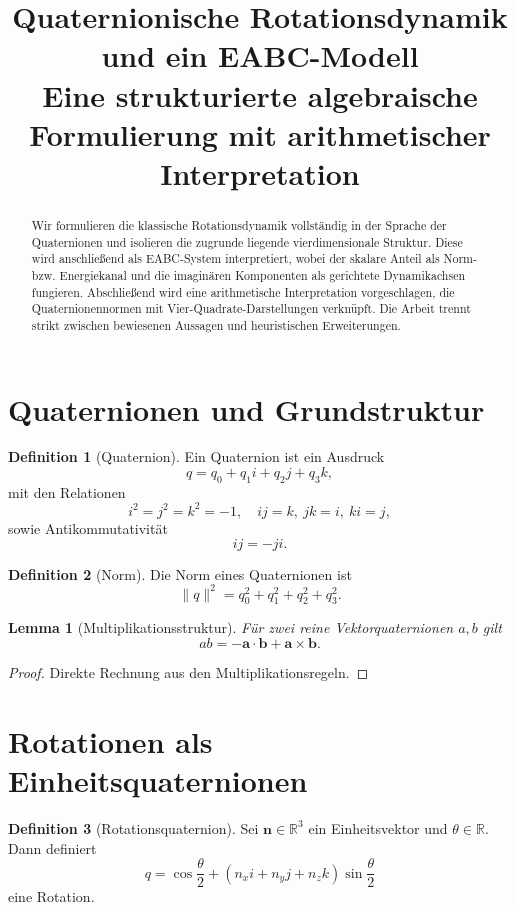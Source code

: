 \documentclass[11pt]{article}
\title{Quaternionische Rotationsdynamik und ein EABC-Modell \\ 
	\large Eine strukturierte algebraische Formulierung mit arithmetischer Interpretation}
\author{}
\date{}
\theoremstyle{definition}
\newtheorem{definition}{Definition}
\theoremstyle{plain}
\newtheorem{lemma}{Lemma}
\begin{document}
	
	\maketitle
	
	\begin{abstract}
		Wir formulieren die klassische Rotationsdynamik vollständig in der Sprache der Quaternionen und isolieren die zugrunde liegende vierdimensionale Struktur. Diese wird anschließend als EABC-System interpretiert, wobei der skalare Anteil als Norm- bzw. Energiekanal und die imaginären Komponenten als gerichtete Dynamikachsen fungieren. Abschließend wird eine arithmetische Interpretation vorgeschlagen, die Quaternionennormen mit Vier-Quadrate-Darstellungen verknüpft. Die Arbeit trennt strikt zwischen bewiesenen Aussagen und heuristischen Erweiterungen.
	\end{abstract}
	
	\section{Quaternionen und Grundstruktur}
	
	\begin{definition}[Quaternion]
		Ein Quaternion ist ein Ausdruck
		\[
		q = q_0 + q_1 i + q_2 j + q_3 k,
		\]
		mit den Relationen
		\[
		i^2 = j^2 = k^2 = -1, \quad ij = k,\ jk = i,\ ki = j,
		\]
		sowie Antikommutativität
		\[
		ij = -ji.
		\]
	\end{definition}
	
	\begin{definition}[Norm]
		Die Norm eines Quaternionen ist
		\[
		\|q\|^2 = q_0^2 + q_1^2 + q_2^2 + q_3^2.
		\]
	\end{definition}
	
	\begin{lemma}[Multiplikationsstruktur]
		Für zwei reine Vektorquaternionen $a,b$ gilt
		\[
		ab = -\mathbf a \cdot \mathbf b + \mathbf a \times \mathbf b.
		\]
	\end{lemma}
	
	\begin{proof}
		Direkte Rechnung aus den Multiplikationsregeln.
	\end{proof}
	
	\section{Rotationen als Einheitsquaternionen}
	
	\begin{definition}[Rotationsquaternion]
		Sei $\mathbf n \in \mathbb{R}^3$ ein Einheitsvektor und $\theta \in \mathbb{R}$. Dann definiert
		\[
		q = \cos\frac{\theta}{2} + (n_x i + n_y j + n_z k)\sin\frac{\theta}{2}
		\]
		eine Rotation.
	\end{definition}
	
\end{document}
